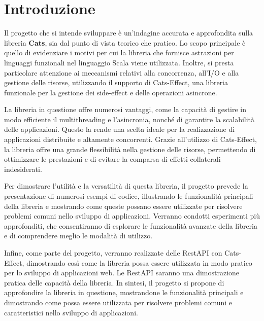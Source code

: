 \chapter{Introduzione}

Il progetto che si intende sviluppare è un'indagine accurata e approfondita sulla libreria \textbf{Cats}, sia dal punto di vista teorico che pratico. Lo scopo principale è quello di evidenziare i motivi per cui la libreria che fornisce astrazioni per linguaggi funzionali nel linguaggio Scala viene utilizzata. Inoltre, si presta particolare attenzione ai meccanismi relativi alla concorrenza, all'I/O e alla gestione delle risorse, utilizzando il supporto di Cats-Effect, una libreria funzionale per la gestione dei side-effect e delle operazioni asincrone.

La libreria in questione offre numerosi vantaggi, come la capacità di gestire in modo efficiente il multithreading e l'asincronia, nonché di garantire la scalabilità delle applicazioni. Questo la rende una scelta ideale per la realizzazione di applicazioni distribuite e altamente concorrenti. Grazie all'utilizzo di Cats-Effect, la libreria offre una grande flessibilità nella gestione delle risorse, permettendo di ottimizzare le prestazioni e di evitare la comparsa di effetti collaterali indesiderati.

Per dimostrare l'utilità e la versatilità di questa libreria, il progetto prevede la presentazione di numerosi esempi di codice, illustrando le funzionalità principali della libreria e mostrando come queste possano essere utilizzate per risolvere problemi comuni nello sviluppo di applicazioni. Verranno condotti esperimenti più approfonditi, che consentiranno di esplorare le funzionalità avanzate della libreria e di comprendere meglio le modalità di utilizzo.

Infine, come parte del progetto, verranno realizzate delle RestAPI con Cats-Effect, dimostrando così come la libreria possa essere utilizzata in modo pratico per lo sviluppo di applicazioni web. Le RestAPI saranno una dimostrazione pratica delle capacità della libreria. In sintesi, il progetto si propone di approfondire la libreria in questione, mostrandone le funzionalità principali e dimostrando come possa essere utilizzata per risolvere problemi comuni e caratteristici nello sviluppo di applicazioni.
